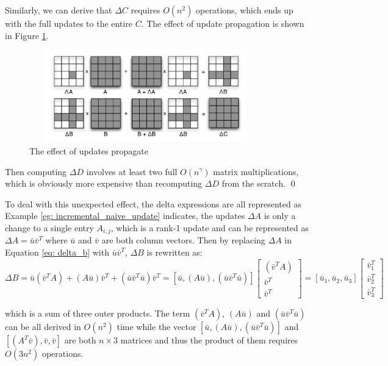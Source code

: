 \begin{example}
Similarly, we can derive that $\Delta C$ requires $O(n^2)$ operations, which ends up with the full updates to the entire $C$. The effect of update propagation is shown in Figure \ref{fig:update_propagete}.

\begin{figure}
    \centering
    \includegraphics[width=10cm, height=4cm]{Figures/update_propagation.png}
    \caption{The effect of updates propagate}
    \label{fig:update_propagete}
\end{figure}

Then computing $\Delta D$ involves at least two full $O(n^{\gamma})$ matrix multiplications, which is obviously more expensive than recomputing $\Delta D$ from the scratch. \qed
\end{example}


To deal with this unexpected effect, the delta expressions are all represented as Example \ref{eg: incremental_naive_update} indicates, the updates $\Delta A$ is only a change to a single entry $A_{i,j}$, which is a rank-1 update and can be represented as $\Delta A = \bar{u}\bar{v}^T$ where $\bar{u}$ and $\bar{v}$ are both column vectors. Then by replacing $\Delta A$ in Equation \ref{eq: delta_b} with $\bar{u}\bar{v}^T$, $\Delta B$ is rewritten as:
\begin{equation}\label{eq: update_b_product}
\Delta B = \bar{u}(\bar{v}^TA) + (A\bar{u})\bar{v}^T + (\bar{u}\bar{v}^T\bar{u})\bar{v}^T=[\bar{u}, (A\bar{u}), (\bar{u}\bar{v}^T\bar{u})]
\begin{bmatrix}
    (\bar{v}^TA)  \\
    \bar{v}^T  \\
    \bar{v}^T   
\end{bmatrix}
=[\bar{u}_1, \bar{u}_2, \bar{u}_3]
\begin{bmatrix}
    \bar{v}^T_1  \\
    \bar{v}^T_2  \\
    \bar{v}^T_3  
\end{bmatrix}
\end{equation}

which is a sum of three outer products. The term $(\bar{v}^TA)$, $(A\bar{u})$ and $(\bar{u}\bar{v}^T\bar{u})$ can be all derived in $O(n^2)$ time while the vector $[\bar{u}, (A\bar{u}), (\bar{u}\bar{v}^T\bar{u})]$ and $[(A^T\bar{v}), \bar{v}, \bar{v}]$ are both $n \times 3$ matrices and thus the product of them requires $O(3n^2)$ operations.

